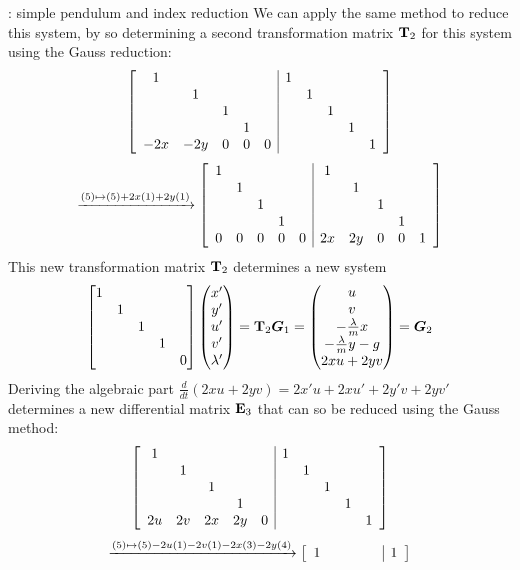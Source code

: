 \begin{example}{: simple pendulum and index reduction}
		We can apply the same method to reduce this system, by so determining a second transformation matrix $\mathbf{T}_2$ for this system using the Gauss reduction:
		\[ \begin{bmatrix} \begin{array} {ccccc | ccccc}
				1   &&&&& 1 \\ 
				& 1 &&&&& 1 \\ 
				&& 1 &&&&& 1 \\ 
				&&& 1 &&&&& 1 \\ 
				-2x & -2y & 0 & 0 & 0 &&&&& 1
		\end{array} \end{bmatrix} \]
		\[ \xrightarrow{(5) \mapsto (5) + 2x (1) + 2 y(1)}\begin{bmatrix} \begin{array} {ccccc | ccccc}
			1 &&&&& 1 \\ 
			& 1 &&&&& 1 \\ 
			&& 1 &&&&& 1 \\ 
			&&& 1 &&&&& 1 \\ 
			0 & 0 & 0 & 0 & 0 &2x& 2y & 0 & 0 & 1
		\end{array} \end{bmatrix} \]
		This new transformation matrix $\mathbf{T}_2$ determines a  new system
		\[ \begin{bmatrix}  1  \\ & 1 \\ && 1 \\ &&& 1 \\ &&&& 0  \end{bmatrix} \begin{pmatrix} x' \\ y' \\ u' \\ v' \\ \lambda' \end{pmatrix} = \mathbf{T}_2 \boldsymbol{G}_1 = \begin{pmatrix} u \\ v \\ - \frac \lambda m x \\ -\frac \lambda m  y - g \\ 2xu + 2yv \end{pmatrix} = \boldsymbol{G}_2 \]
		Deriving the algebraic part $\frac d{dt}(2xu + 2yv) = 2x'u +2x u' + 2y'v + 2yv'$ determines a new differential matrix $\mathbf{E}_3$ that can so be reduced using the Gauss method:
		\[ \begin{bmatrix} \begin{array} {ccccc | ccccc}
				1   &&&&& 1 \\ 
				& 1 &&&&& 1 \\ 
				&& 1 &&&&& 1 \\ 
				&&& 1 &&&&& 1 \\ 
				2u & 2v & 2x & 2y & 0 &&&&& 1
		\end{array} \end{bmatrix} \]
		\[ \xrightarrow{(5) \mapsto (5) -2u (1) -2v (1) - 2x(3) - 2y(4)}\begin{bmatrix} \begin{array} {ccccc | ccccc}
				1 &&&&& 1 \\ 

\end{array} \end{bmatrix}\]
\end{example}
